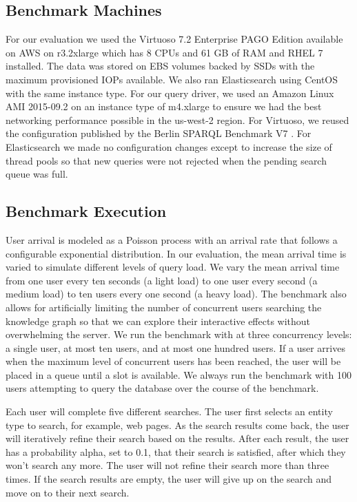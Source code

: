 \subsection{Benchmark Machines}
For our evaluation we used the Virtuoso 7.2 Enterprise PAGO Edition\cite{virtuosopago} available on AWS on r3.2xlarge which has 8 CPUs and 61 GB of RAM and RHEL 7 installed.  
The data was stored on EBS volumes backed by SSDs with the maximum provisioned IOPs available. 
We also ran Elasticsearch using CentOS with the same instance type.  
For our query driver, we used an Amazon Linux AMI 2015-09.2 on an instance type of m4.xlarge to ensure we had the best networking performance possible in the us-west-2 region.    
For Virtuoso, we reused the configuration published by the Berlin SPARQL Benchmark V7 \cite{bsbmv7}.
For Elasticsearch we made no configuration changes except to increase the size of thread pools so that new queries were not rejected when the pending search queue was full. 

\subsection{Benchmark Execution}
User arrival is modeled as a Poisson process with an arrival rate that follows a configurable exponential distribution.  
In our evaluation, the mean arrival time is varied to simulate different levels of query load.  
We vary the mean arrival time from one user every ten seconds (a light load) to one user every second (a medium load) to ten users every one second (a heavy load).
The benchmark also allows for artificially limiting the number of concurrent users searching the knowledge graph so that we can explore their interactive effects without overwhelming the server.  
We run the benchmark with at three concurrency levels: a single user, at most ten users, and at most one hundred users.
If a user arrives when the maximum level of concurrent users has been reached, the user will be placed in a queue until a slot is available.  
We always run the benchmark with 100 users attempting to query the database over the course of the benchmark.

Each user will complete five different searches. 
The user first selects an entity type to search, for example, web pages.
As the search results come back, the user will iteratively refine their search based on the results.
After each result, the user has a probability alpha, set to 0.1, that their search is satisfied, after which they won't search any more.
The user will not refine their search more than three times.
If the search results are empty, the user will give up on the search and move on to their next search.

